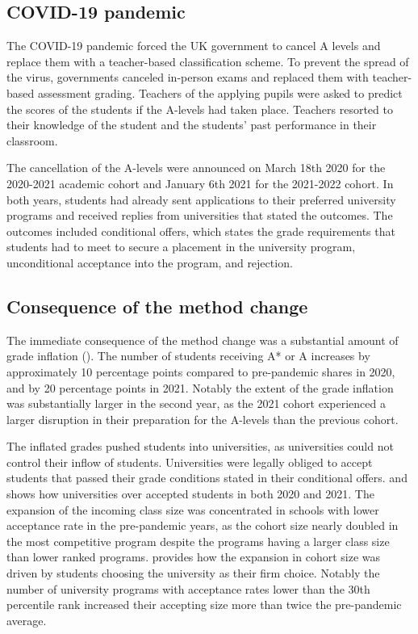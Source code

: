 \subsection{COVID-19 pandemic}
The COVID-19 pandemic forced the UK government to cancel A levels and replace them with a teacher-based classification scheme. To prevent the spread of the virus, governments canceled in-person exams and replaced them with teacher-based assessment grading. Teachers of the applying pupils were asked to predict the scores of the students if the A-levels had taken place. Teachers resorted to their knowledge of the student and the students' past performance in their classroom. 

The cancellation of the A-levels were announced on March 18th 2020 for the 2020-2021 academic cohort and January 6th 2021 for the 2021-2022 cohort. In both years, students had already sent applications to their preferred university programs and received replies from universities that stated the outcomes. The outcomes included conditional offers, which states the grade requirements that students had to meet to secure a placement in the university program, unconditional acceptance into the program, and rejection.  

\subsection{Consequence of the method change}
The immediate consequence of the method change was a substantial amount of grade inflation (). The number of students receiving A* or A increases by approximately 10 percentage points compared to pre-pandemic shares in 2020, and by 20 percentage points in 2021. Notably the extent of the grade inflation was substantially larger in the second year, as the 2021 cohort experienced a larger disruption in their preparation for the A-levels than the previous cohort. 

The inflated grades pushed students into universities, as universities could not control their inflow of students. Universities were legally obliged to accept students that passed their grade conditions stated in their conditional offers.  and  shows how universities over accepted students in both 2020 and 2021. The expansion of the incoming class size was concentrated in schools with lower acceptance rate in the pre-pandemic years, as the cohort size nearly doubled in the most competitive program despite the programs having a larger class size than lower ranked programs.  provides how the expansion in cohort size was driven by students choosing the university as their firm choice. Notably the number of university programs with acceptance rates lower than the 30th percentile rank increased their accepting size more than twice the pre-pandemic average. 

